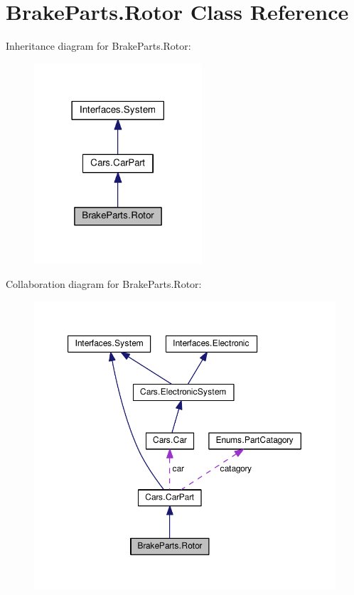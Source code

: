 \hypertarget{classBrakeParts_1_1Rotor}{}\section{Brake\+Parts.\+Rotor Class Reference}
\label{classBrakeParts_1_1Rotor}


Inheritance diagram for Brake\+Parts.\+Rotor\+:\nopagebreak
\begin{figure}[H]
\begin{center}
\leavevmode
\includegraphics[width=177pt]{classBrakeParts_1_1Rotor__inherit__graph}
\end{center}
\end{figure}


Collaboration diagram for Brake\+Parts.\+Rotor\+:\nopagebreak
\begin{figure}[H]
\begin{center}
\leavevmode
\includegraphics[width=350pt]{classBrakeParts_1_1Rotor__coll__graph}
\end{center}
\end{figure}
